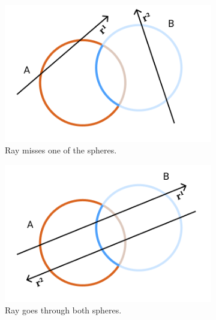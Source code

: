 \documentclass[a4paper,11pt,oneside]{article}
\begin{document}
\begin{figure}[ht]
     \centering
      \begin{subfigure}[b]{0.3\textwidth}
      	\centering
        \includegraphics[width=\textwidth]{section3/3.4/difference-case-2.png}
        \caption{Ray misses one of the spheres.}
        \label{sec3.4:difference-case-1}
     \end{subfigure}
     \hfill
     \begin{subfigure}[b]{0.3\textwidth}
         \centering
         \includegraphics[width=\textwidth]{section3/3.4/difference-case-1.png}
         \caption{Ray goes through both spheres.}
         \label{sec3.4:difference-case-2}
     \end{subfigure}
     \hfill
     \begin{subfigure}[b]{0.3\textwidth}
         \centering

\end{subfigure}
\end{figure}
\end{document}
